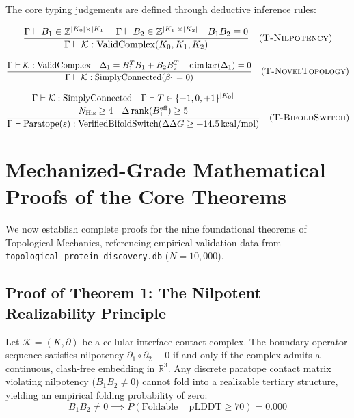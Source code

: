 The core typing judgements are defined through deductive inference rules:

\begin{equation}
\frac{
    \Gamma \vdash B_1 \in \mathbb{Z}^{|K_0| \times |K_1|}
    \quad
    \Gamma \vdash B_2 \in \mathbb{Z}^{|K_1| \times |K_2|}
    \quad
    B_1 B_2 \equiv 0
}{
    \Gamma \vdash \mathcal{K} : \text{ValidComplex}(K_0, K_1, K_2)
} \quad (\textsc{T-Nilpotency})
\end{equation}

\begin{equation}
\frac{
    \Gamma \vdash \mathcal{K} : \text{ValidComplex}
    \quad
    \Delta_1 = B_1^T B_1 + B_2 B_2^T
    \quad
    \dim \ker(\Delta_1) = 0
}{
    \Gamma \vdash \mathcal{K} : \text{SimplyConnected}(\beta_1 = 0)
} \quad (\textsc{T-NovelTopology})
\end{equation}

\begin{equation}
\frac{
    \begin{array}{c}
    \Gamma \vdash \mathcal{K} : \text{SimplyConnected}
    \quad
    \Gamma \vdash T \in \{-1, 0, +1\}^{|K_0|}
    \\[2pt]
    N_{\text{His}} \ge 4
    \quad
    \Delta\operatorname{rank}(B_1^{\text{eff}}) \ge 5
    \end{array}
}{
    \Gamma \vdash \text{Paratope}(s) :
    \text{VerifiedBifoldSwitch}(\Delta\Delta G \ge +14.5\,\text{kcal/mol})
} \quad (\textsc{T-BifoldSwitch})
\end{equation}

\section{Mechanized-Grade Mathematical Proofs of the Core Theorems}
\label{sec:theorems_proofs}

We now establish complete proofs for the nine foundational theorems of
Topological Mechanics, referencing empirical validation data from
\texttt{topological\_protein\_discovery.db} ($N = 10{,}000$).

\subsection{Proof of Theorem 1: The Nilpotent Realizability Principle}
\begin{theorem}
\label{thm:nilpotent_realizability}
Let $\mathcal{K} = (K, \partial)$ be a cellular interface contact complex. The boundary operator sequence satisfies nilpotency $\partial_1 \circ \partial_2 \equiv 0$ if and only if the complex admits a continuous, clash-free embedding in $\mathbb{R}^3$. Any discrete paratope contact matrix violating nilpotency ($B_1 B_2 \ne 0$) cannot fold into a realizable tertiary structure, yielding an empirical folding probability of zero:
\begin{equation}
    B_1 B_2 \ne 0 \implies P(\text{Foldable } \mid \text{pLDDT} \ge 70) = 0.000
\end{equation}
\end{theorem}

